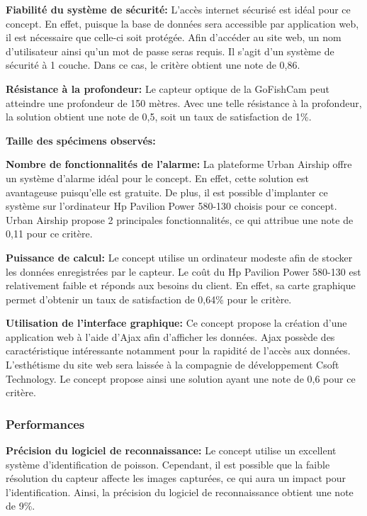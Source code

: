 \textbf{Fiabilité du système de sécurité:} L'accès internet sécurisé est idéal pour ce concept. En effet, puisque la base de données sera accessible par application web, il est nécessaire que celle-ci soit protégée. Afin d'accéder au site web, un nom d'utilisateur ainsi qu'un mot de passe seras requis. Il s'agit d'un système de sécurité à 1 couche. Dans ce cas, le critère obtient une note de 0,86.
\vspace{5mm}

\textbf{Résistance à la profondeur:} Le capteur optique de la GoFishCam peut atteindre une profondeur de 150 mètres. Avec une telle résistance à la profondeur, la solution obtient une note de 0,5, soit un taux de satisfaction de 1\%. \vspace{5mm}

\textbf{Taille des spécimens observés:} 
\vspace{5mm}

\textbf{Nombre de fonctionnalités de l'alarme:} La plateforme Urban Airship offre un système d'alarme idéal pour le concept. En effet, cette solution est avantageuse puisqu'elle est gratuite. De plus, il est possible d'implanter ce système sur l'ordinateur Hp Pavilion Power 580-130 choisis pour ce concept. Urban Airship propose 2 principales fonctionnalités, ce qui attribue une note de 0,11 pour ce critère.
\vspace{5mm}

\textbf{Puissance de calcul:} Le concept utilise un ordinateur modeste afin de stocker les données enregistrées par le capteur. Le coût du Hp Pavilion Power 580-130 est relativement faible et réponds aux besoins du client. En effet, sa carte graphique permet d'obtenir un taux de satisfaction de 0,64\% pour le critère. 
\vspace{5mm}

\textbf{Utilisation de l'interface graphique:} Ce concept propose la création d'une application web à l'aide d'Ajax afin d'afficher les données. Ajax possède des caractéristique intéressante notamment pour la rapidité de l'accès aux données. L'esthétisme du site web sera laissée à la compagnie de développement Csoft Technology. Le concept propose ainsi une solution ayant une note de 0,6 pour ce critère.


\subsubsection{Performances}

\textbf{Précision du logiciel de reconnaissance:} Le concept utilise un excellent système d'identification de poisson. Cependant, il est possible que la faible résolution du capteur affecte les images capturées, ce qui aura un impact pour l'identification. Ainsi, la précision du logiciel de reconnaissance obtient une note de 9\%. \vspace{5mm}

